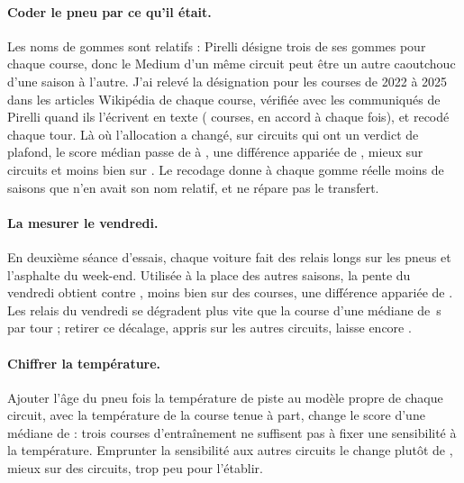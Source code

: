 \documentclass[11pt,a4paper]{article}
\begin{document}
\paragraph{Coder le pneu par ce qu'il était.} Les noms de gommes sont relatifs :
Pirelli désigne trois de ses gommes pour chaque course, donc le Medium d'un même
circuit peut être un autre caoutchouc d'une saison à l'autre. J'ai relevé la
désignation pour les \NAllocationRaces{} courses de 2022 à 2025 dans les
articles Wikipédia de chaque course, vérifiée avec les communiqués de Pirelli
quand ils l'écrivent en texte (\NAllocationPirelli{} courses, en accord à chaque
fois), et recodé chaque tour. Là où l'allocation a changé, sur
\NCompoundChanged{} circuits qui ont un verdict de plafond, le score médian passe
de \CompoundRelative{} à \CompoundReal{}, une différence appariée de
\CompoundDiff{} \CompoundDiffCi{}, mieux sur \NCompoundBetter{} circuits et moins
bien sur \NCompoundWorse{}. Le recodage donne à chaque gomme réelle moins de
saisons que n'en avait son nom relatif, et ne répare pas le transfert.

\paragraph{La mesurer le vendredi.} En deuxième séance d'essais, chaque voiture
fait des relais longs sur les pneus et l'asphalte du week-end. Utilisée à la
place des autres saisons, la pente du vendredi obtient \FridayRaw{} contre
\FridayOther{}, moins bien sur \NFridayRawWorse{} des \NFridayRaces{} courses,
une différence appariée de \FridayRawDiff{} \FridayRawDiffCi{}. Les relais du
vendredi se dégradent plus vite que la course d'une médiane de
\FridayOffset{}\,s par tour ; retirer ce décalage, appris sur les autres
circuits, laisse encore \FridayCorrected{}.

\paragraph{Chiffrer la température.} Ajouter l'âge du pneu fois la température
de piste au modèle propre de chaque circuit, avec la température de la course
tenue à part, change le score d'une médiane de \TempOwnDiff{} \TempOwnDiffCi{} :
trois courses d'entraînement ne suffisent pas à fixer une sensibilité à la
température. Emprunter la sensibilité aux autres circuits le change plutôt de
\TempCatDiff{} \TempCatDiffCi{}, mieux sur \TempCatBetter{} des \TempN{}
circuits, trop peu pour l'établir.
\end{document}
